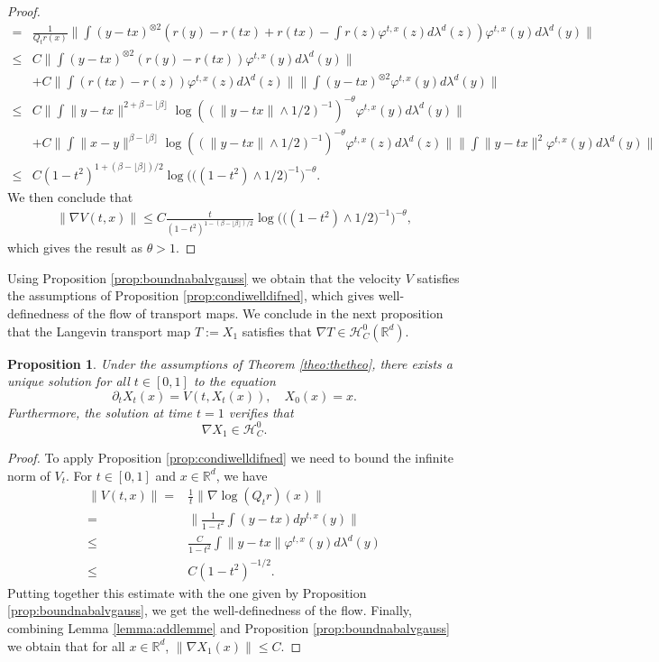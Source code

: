 \documentclass{article}
\newtheorem{proposition}{Proposition}
\begin{document}
\begin{proof}
\begin{align*}
= & \frac{1}{Q_tr(x)}\|\int\left(y-tx\right)^{\otimes2}\left( r(y)-r(tx)+r(tx)-\int r(z)\varphi^{t,x}(z)d\lambda^d(z)\right)\varphi^{t,x}(y)d\lambda^d(y)\|\\
      \leq & C \|\int\left(y-tx\right)^{\otimes2}\left( r(y)-r(tx)\right)\varphi^{t,x}(y)d\lambda^d(y)\|\nonumber\\
      & + C \| \int (r(tx)-r(z))\varphi^{t,x}(z)d\lambda^d(z)\| \|\int\left(y-tx\right)^{\otimes2}\varphi^{t,x}(y)d\lambda^d(y)\|
      \nonumber\\
    \leq & C \|\int\|y-tx\|^{2+\beta-\lfloor \beta \rfloor}\log((\|y-tx\|\wedge 1/2)^{-1})^{-\theta}\varphi^{t,x}(y)d\lambda^d(y)\|\\
    & +C\| \int \|x-y\|^{\beta-\lfloor \beta \rfloor}\log((\|y-tx\|\wedge 1/2)^{-1})^{-\theta}\varphi^{t,x}(z)d\lambda^d(z)\| \|\int\|y-tx\|^2\varphi^{t,x}(y)d\lambda^d(y)\|\\
    \leq & C(1-t^2)^{1+(\beta-\lfloor \beta \rfloor)/2}\log\Big(\big((1-t^2)\wedge 1/2\big)^{-1}\Big)^{-\theta}.
\end{align*}
We then conclude that
\begin{align*}
    \|\nabla V(t,x)\|\leq C \frac{t}{(1-t^2)^{1-(\beta-\lfloor \beta \rfloor)/2}}\log\Big(\big((1-t^2)\wedge 1/2\big)^{-1}\Big)^{-\theta},
\end{align*}
which gives the result as $\theta>1$.
\end{proof}
 Using Proposition \ref{prop:boundnabalvgauss} we obtain that the velocity $V$ satisfies the assumptions of Proposition \ref{prop:condiwelldifned}, which gives well-definedness of the flow of transport maps. We conclude in the next proposition that the Langevin transport map $T:=X_1$ satisfies that $\nabla T \in \mathcal{H}^0_C(\mathbb{R}^d)$.
\begin{proposition}
    Under the assumptions of Theorem \ref{theo:thetheo}, there exists a unique solution for all $t\in [0,1]$ to the equation
    $$\partial_t X_t(x) =V(t,X_t(x)), \quad X_0(x)=x.$$
    Furthermore, the solution at time $t=1$ verifies that
    $$\nabla X_1 \in \mathcal{H}^0_C.$$
\end{proposition}
\begin{proof}
    To apply Proposition \ref{prop:condiwelldifned} we need to bound the infinite norm of $V_t$. For $t\in[0,1]$ and $x\in \mathbb{R}^d$, we have
    \begin{align*}
        \| V(t,x)\| = &\frac{1}{t}\|\nabla \log(Q_t r)(x)\|\\
     =&\|\frac{1}{1-t^2}\int (y-tx)dp^{t,x}(y)\|
     \\
     \leq &\frac{C}{1-t^2}\int \|y-tx\|\varphi^{t,x}(y)d\lambda^d(y)\\
    \leq & C(1-t^2)^{-1/2}.
    \end{align*}
    Putting together this estimate with the one given by Proposition \ref{prop:boundnabalvgauss}, we get the well-definedness of the flow. Finally, combining Lemma \ref{lemma:addlemme} and Proposition \ref{prop:boundnabalvgauss} we obtain that for all $x\in \mathbb{R}^d$, $\|\nabla X_1(x)\|\leq C$. 
\end{proof}
\end{document}
